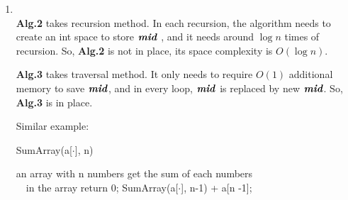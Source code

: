 \documentclass[12pt,a4paper]{article}
\makeatletter
\newtheorem*{solution}{Solution}
\theoremstyle{definition}
\renewenvironment{solution}[1][Solution] {\par\pushQED{\qed}\normalfont\topsep6\p@\@plus6\p@\relax\trivlist\item[\hskip\labelsep\bfseries#1\@addpunct{.}]\ignorespaces}{\popQED\endtrivlist\@endpefalse} \makeatother
\makeatother
\begin{document}
\begin{enumerate}
\begin{minipage}[t]{0.49\textwidth}
\begin{algorithm}[H]
    
\end{algorithm}
\end{minipage}
\begin{minipage}[t]{0.455\textwidth}
\begin{algorithm}[H]
\BlankLine
	\caption{BinSearch($a[\cdot]$, $x$, $low$, $high$)} \label{Alg-NonRecursiveBS}
	\BlankLine	
	;
\end{algorithm}\end{minipage}
\begin{solution}
~\\
\textbf{Alg.2} takes recursion method. In each recursion, the algorithm needs to create an int space to store $\textbf{\textit{mid}}$ , and it needs around $\log n$ times of recursion. So, \textbf{Alg.2} is not in place, its space complexity is $O(\log n)$. 

\textbf{Alg.3} takes traversal method. It only needs to require $O(1)$ additional memory to save $\textbf{\textit{mid}}$, and in every loop, $\textbf{\textit{mid}}$ is replaced by new $\textbf{\textit{mid}}$. So, \textbf{Alg.3} is in place.

Similar example:


\begin{minipage}[t]{0.45\textwidth}
	
	\begin{algorithm}[H]
		\caption{SumArray(a[$\cdot$], n)}
		\label{alg:3}
		\begin{algorithmic}
			\REQUIRE an array with n numbers
			\ENSURE get the sum of each numbers \\ \qquad \quad \, \,  in the array
			\BlankLine	
			\STATE return 0;
			\ELSE
			\RETURN SumArray(a[$\cdot$], n-1) + a[n -1];
			\ENDIF

		\end{algorithmic}
	\end{algorithm}


\end{minipage}
\end{solution}
\end{enumerate}
\end{document}
